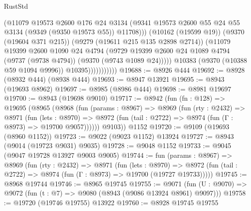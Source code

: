 \begin{lexlean}{RustStd}
\begin{coremodule}
{\begin{coremodule}
{{{{{{{{{{{{{{{{{{{{{{{{{{{{{{{{{{{{{{{                              (@11079
                                @19573
                                @2600
                                @176
                                @24
                                @3134
                                (@9341
                                  @19573
                                  @2600
                                  @55
                                  @24
                                  @55
                                  @3134
                                  (@9349 (@9350 @19573 @55))
                                  @11708)))
                            (@10162 (@19599 @19))
                            (@9370 (@19604 @371 @215))
                            (@9279 (@19611 @215 @135 @2898 @2714))
                            (@11079
                              @19399
                              @2600
                              @1090
                              @24
                              @4794
                              (@9729
                                @19399
                                @2600
                                @24
                                @1089
                                @4794
                                (@9737 (@9738 @4794))
                                (@9370 (@9743 @1089 @24)))))
                          @10383
                          (@9370 (@10388 @59 @1094 @9996))
                          @10395)))))))))))
@19688 := @8926 @444
@19692 := @8928 (@8932 @444) (@8938 @444)
@19693 := @8947 @13921
@19695 := @8943 (@19693 @8962)
@19697 := @8985 (@8986 @444)
@19698 := @8981 @19697
@19700 := @8943 (@19698 @9010)
@19717 := @8942
    (fun (fn : @128) =>
    @19695
      (@8965
        (@8968
          (fun (params : @8967) =>
          @8969
            (fun (rty : @2432) =>
            @8971
              (fun (lets : @8970) =>
              @8972 (fun (tail : @2722) => @8974 (fun (Γ : @8973) => @19700 @9057))))))
        @9103))
    @1152
@19720 := @9109 (@19693 (@8960 @1152))
@19723 := @9022 (@9023 @1152) @13924
@19727 := @8943 (@9014 (@19723 @9031) @9035)
@19728 := @9048 @1152
@19733 := @9045 (@9047 @19728 @13927 @9003 @9005)
@19744 := fun (params : @8967) =>
  @8969
    (fun (rty : @2432) =>
    @8971
      (fun (lets : @8970) =>
      @8972 (fun (tail : @2722) => @8974 (fun (Γ : @8973) => @19700 (@19727 @19733)))))
@19745 := @8968 @19744
@19746 := @8965 @19745
@19755 := @9071
    (fun (U : @9070) => @9072 (fun (t : @7) => @9080 (@8943 (@9086 @13924 @8961) @9097)))
@19758 := @19720 (@19746 @19755) @13922
@19760 := @8928 @19745 @19755
}}}}}}}}}}}}}}}}}}}}}}}}}}}}}}}}}}}}}}}
\end{coremodule}}
\end{coremodule}
\end{lexlean}
